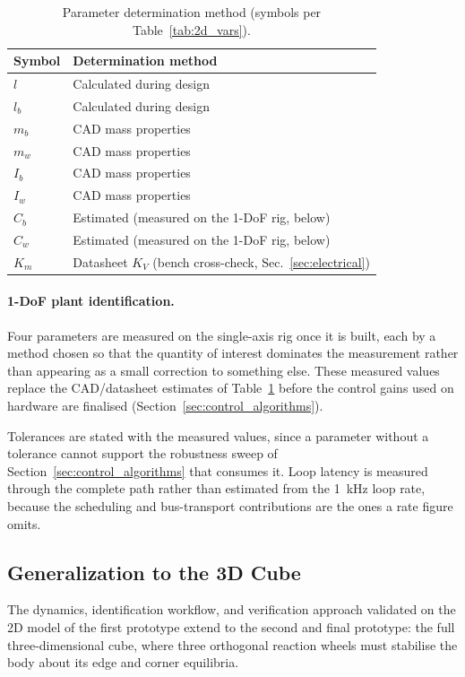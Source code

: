 \begin{table}[htbp]
\centering
\caption[Parameter determination method]{Parameter determination method (symbols per Table~\ref{tab:2d_vars}).}
\label{tab:params}
\begin{tabular}{ll}
\toprule
Symbol & Determination method \\
\midrule
$l$   & Calculated during design \\
$l_b$ & Calculated during design \\
$m_b$ & CAD mass properties \\
$m_w$ & CAD mass properties \\
$I_b$ & CAD mass properties \\
$I_w$ & CAD mass properties \\
$C_b$ & Estimated (measured on the 1-DoF rig, below) \\
$C_w$ & Estimated (measured on the 1-DoF rig, below) \\
$K_m$ & Datasheet $K_V$ (bench cross-check, Sec.~\ref{sec:electrical}) \\
\bottomrule
\end{tabular}
\end{table}

\paragraph{1-DoF plant identification.} Four parameters are measured on the
single-axis rig once it is built, each by a method chosen so that the quantity
of interest dominates the measurement rather than appearing as a small
correction to something else. These measured values replace the CAD/datasheet
estimates of Table~\ref{tab:params} before the control gains used on hardware
are finalised (Section~\ref{sec:control_algorithms}).


Tolerances are stated with the measured values, since a parameter without a
tolerance cannot support the robustness sweep of Section~\ref{sec:control_algorithms}
that consumes it. Loop latency is measured through the complete path rather than
estimated from the \qty{1}{\kilo\hertz} loop rate, because the scheduling and
bus-transport contributions are the ones a rate figure omits.

\subsection{Generalization to the 3D Cube}
\label{sec:3dmodel}

The dynamics, identification workflow, and verification approach validated on the
2D model of the first prototype extend to the second and final prototype: the
full three-dimensional cube, where three orthogonal reaction wheels must
stabilise the body about its edge and corner equilibria.

